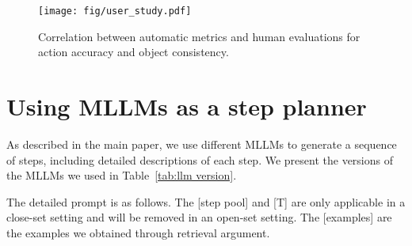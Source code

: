 \begin{figure}[t]
  \centering
   \texttt{[image: fig/user\_study.pdf]}
   \caption{Correlation between automatic metrics and human evaluations for action accuracy and object consistency.}
   \label{fig:user}
\end{figure}


\section{Using MLLMs as a step planner}
\label{appendix llm}
As described in the main paper, we use different MLLMs to generate a sequence of steps, including detailed descriptions of each step. We present the versions of the MLLMs we used in Table~\ref{tab:llm version}.

\begin{table}[h]
\centering
{}
\caption{Ablations on MLLMs planning. We present the versions of the MLLMs used in our study.}
\label{tab:llm version}
\end{table}

The detailed prompt is as follows. The [step pool] and [T] are only applicable in a close-set setting and will be removed in an open-set setting. The [examples] are the examples we obtained through retrieval argument.


